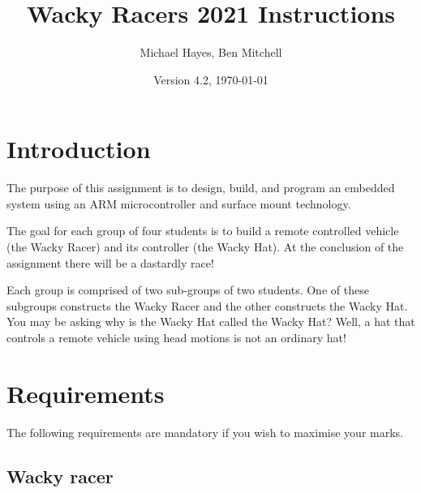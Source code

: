 \documentclass[11pt, a4paper]{article}
\title{Wacky Racers 2021 Instructions}
\author{Michael Hayes, Ben Mitchell}
\date{Version 4.2, \today}
\begin{document}
\maketitle

\section{Introduction}

The purpose of this assignment is to design, build, and program an
embedded system using an ARM microcontroller and surface mount
technology.

The goal for each group of four students is to build a remote
controlled vehicle (the Wacky Racer) and its controller (the Wacky
Hat).  At the conclusion of the assignment there will be a dastardly race!

Each group is comprised of two sub-groups of two students.  One of
these subgroups constructs the Wacky Racer and the other constructs
the Wacky Hat.  You may be asking why is the Wacky Hat called the
Wacky Hat?  Well, a hat that controls a remote vehicle using head
motions is not an ordinary hat!


\section{Requirements}

The following requirements are mandatory if you wish to maximise your
marks.


\subsection{Wacky racer}
\end{document}
